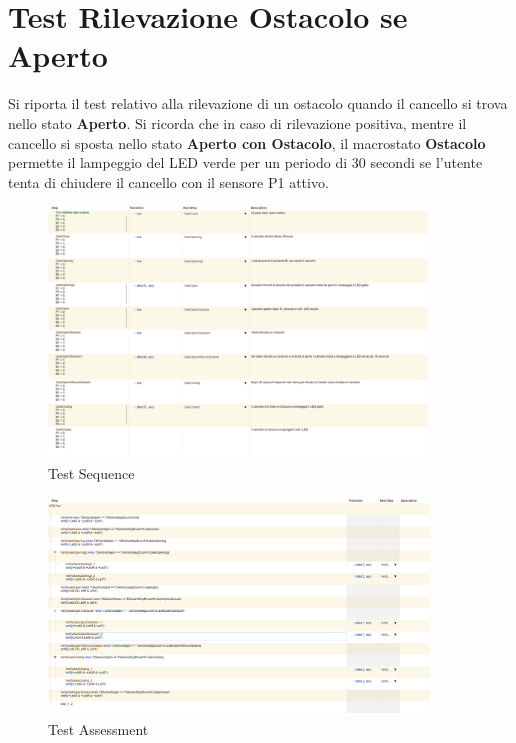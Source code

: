     \section{Test Rilevazione Ostacolo se Aperto}
        Si riporta il test relativo alla rilevazione di un ostacolo quando il cancello si trova nello stato \textbf{Aperto}. Si ricorda che in caso di rilevazione positiva, mentre il cancello si sposta nello stato \textbf{Aperto con Ostacolo}, il macrostato \textbf{Ostacolo} permette il lampeggio del LED verde per un periodo di 30 secondi se l'utente tenta di chiudere il cancello con il sensore P1 attivo. 

        \begin{figure}[H]
            \centering
            \includegraphics[width=0.9\textwidth]{figures/obstacletest.png}
            \caption{Test Sequence}
            \label{obtest}
        \end{figure}
    
        \begin{figure}[H]
            \centering
            \includegraphics[width=0.9\textwidth]{figures/obstacletest1.png}
            \caption{Test Assessment}
            \label{obstest1}
        \end{figure}


